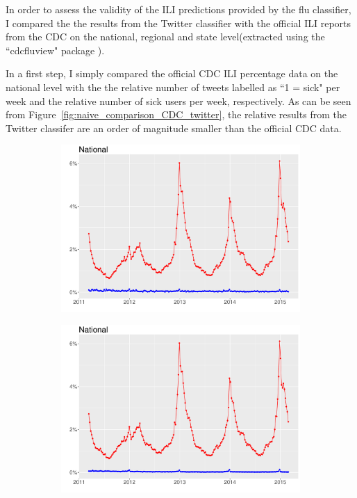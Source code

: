 \documentclass[11pt, a4paper]{report}\usepackage[]{graphicx}\usepackage[]{color}
\begin{document}
In order to assess the validity of the ILI predictions provided by the flu classifier, I compared the the results from the Twitter classifier with the official ILI reports from the CDC on the national, regional and state level(extracted using the ``cdcfluview" package ).\newline

In a first step, I simply compared the official CDC ILI percentage data on the national level with the the relative number of tweets labelled as ``1 = sick" per week and the relative number of sick users per week, respectively. As can be seen from Figure~\ref{fig:naive_comparison_CDC_twitter}, the relative results from the Twitter classifer are an order of magnitude smaller than the official CDC data.

\begin{figure}[H]
\centering
  \begin{subfigure}[t]{0.49\textwidth}
  \includegraphics[width=1\linewidth]{cdc_twitter_comp_nat_raw.pdf}
  \caption{}
  \end{subfigure}
\hfill
  \begin{subfigure}[t]{0.49\textwidth}
  \includegraphics[width=1\linewidth]{cdc_twitter_comp_nat_raw_user.pdf}

\end{subfigure}
\end{figure}
\end{document}
